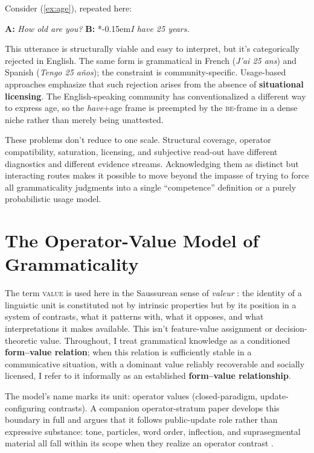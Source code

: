 \documentclass[12pt,letterpaper]{article}
\newcommand{\term}[1]{\textsc{#1}}
\newcommand{\mention}[1]{\textit{#1}}
\newcommand{\olang}[1]{\textit{#1}}
\newcommand{\judgesep}{\kern-0.15em}
\newcommand{\ungram}[1]{*\judgesep#1}
\begin{document}
Consider (\ref{ex:age}), repeated here:

\ea
\textbf{A:} \mention{How old are you?} \textbf{B:} \ungram{\mention{I have 25 years.}}
\z

This utterance is structurally viable and easy to interpret, but it's categorically rejected in English. The same form is grammatical in French (\olang{J'ai 25 ans}) and Spanish (\olang{Tengo 25 años}); the constraint is community-specific. Usage-based approaches \autocite{bybee2006} emphasize that such rejection arises from the absence of \textbf{situational licensing}. The English-speaking community has conventionalized a different way to express age, so the \mention{have}+age frame is preempted by the \textsc{be}-frame in a dense niche rather than merely being unattested.

\bigskip
These problems don't reduce to one scale. Structural coverage, operator compatibility, saturation, licensing, and subjective read-out have different diagnostics and different evidence streams. Acknowledging them as distinct but interacting routes makes it possible to move beyond the impasse of trying to force all grammaticality judgments into a single \enquote{competence} definition or a purely probabilistic usage model.

\section{The Operator-Value Model of Grammaticality}\label{sec:framework}
\label{sec:operator-values}

The term \term{value} is used here in the Saussurean sense of \mention{valeur} \autocite{saussure1916}: the identity of a linguistic unit is constituted not by intrinsic properties but by its position in a system of contrasts, what it patterns with, what it opposes, and what interpretations it makes available. This isn't feature-value assignment or decision-theoretic value. Throughout, I treat grammatical knowledge as a conditioned \textbf{form--value relation}; when this relation is sufficiently stable in a communicative situation, with a dominant value reliably recoverable and socially licensed, I refer to it informally as an established \textbf{form--value relationship}.

The model's name marks its unit: operator values (closed-paradigm, update-configuring contrasts). A companion operator-stratum paper develops this boundary in full and argues that it follows public-update role rather than expressive substance: tone, particles, word order, inflection, and suprasegmental material all fall within its scope when they realize an operator contrast \autocite{reynolds2026operators}.
\end{document}
